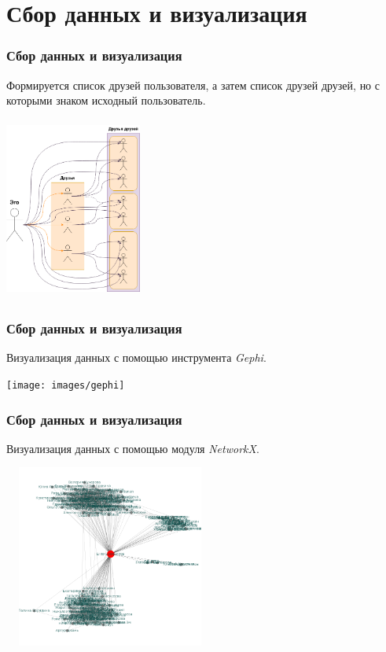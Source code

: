 \documentclass{spbseu}
\begin{document}
    \section{Сбор данных и визуализация}

    \begin{frame}
		\frametitle{Сбор данных и визуализация}
        \tableofcontents[part=2, pausesections]
        \justifying
        Формируется список друзей пользователя, а затем список друзей друзей, но с которыми знаком исходный пользователь.
        \begin{center}
            \includegraphics[width=4.5cm,height=6cm]{images/friends}
        \end{center}
    \end{frame}
    
    \begin{frame}
		\frametitle{Сбор данных и визуализация}
        \justifying
        Визуализация данных с помощью инструмента \textit{Gephi}.
        \begin{center}
            \texttt{[image: images/gephi]}
        \end{center}
    \end{frame}
    
    \begin{frame}
		\frametitle{Сбор данных и визуализация}
        \justifying
        Визуализация данных с помощью модуля \textit{NetworkX}.
        \begin{center}
            \includegraphics[width=7cm,height=6cm]{images/networkx}
        \end{center}
    \end{frame}
\end{document}
